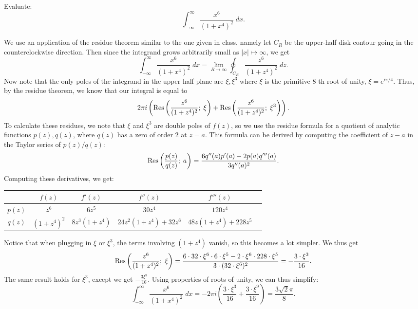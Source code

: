 \documentclass{pset}
\begin{document}
\begin{problem}{11}
  Evaluate:
  \[
    \int^\infty_{-\infty} \frac{x^6}{(1+x^4)^2}\;dx.
  \]
\end{problem}

\begin{solution}
  We use an application of the residue theorem similar to the one given in class, namely let $C_R$ be the upper-half disk contour going in the counterclockwise direction. Then since the integrand grows arbitrarily small as $|x|\mapsto \infty$, we get
  \[\int^\infty_{-\infty} \frac{x^6}{(1+x^4)^2}\;dx = \lim_{R \to \infty}\oint_{C_R} \frac{z^6}{(1+z^4)^2}\;dz.\]
  Now note that the only poles of the integrand in the upper-half plane are $\xi, \xi^3$ where $\xi$ is the primitive $8$-th root of unity, $\xi = e^{i\pi / 4}$. Thus, by the residue theorem, we know that our integral is equal to
  \[{2\pi i}\left(\textrm{Res}\left(\frac{z^6}{(1+z^4)^2};\; \xi\right) + \textrm{Res}\left(\frac{z^6}{(1+z^4)^2};\; \xi^3\right)\right).\]
  To calculate these residues, we note that $\xi$ and $\xi^3$ are double poles of $f(z)$, so we use the residue formula for a quotient of analytic functions $p(z), q(z)$, where $q(z)$ has a zero of order $2$ at $z=a$. This formula can be derived by computing the coefficient of $z-a$ in the Taylor series of $p(z)/q(z)$:
  \[
    \textrm{Res}\left(\frac{p(z)}{q(z)};\; a\right) = \frac{6q''(a)p'(a) - 2p(a)q'''(a)}{3q''(a)^2}.
  \]
  Computing these derivatives, we get:
  \begin{center}\renewcommand{\arraystretch}{1.2}
  \begin{tabular}{ |c|c|c|c|c|c| } 
  \hline
  & $f(z)$ & $f'(z)$ & $f''(z)$ &$f'''(z)$\\
  \hline
    $p(z)$ & $z^6$ & $6z^5$ & $30z^4$ & $120z^4$\\ 
    $q(z)$ & $(1+z^4)^2$ & $8z^3(1+z^4)$ & $24z^2(1+z^4) + 32z^6$ & $48z(1+z^4) + 228z^5$\\ 
  \hline
  \end{tabular}
  \end{center}
  Notice that when plugging in $\xi$ or $\xi^3$, the terms involving $(1+z^4)$ vanish, so this becomes a lot simpler. We thus get
  \[
    \textrm{Res}\left(\frac{z^6}{(1+z^4)^2};\; \xi\right) = \frac{6\cdot 32\cdot \xi^6 \cdot 6\cdot \xi^5 - 2\cdot \xi^6\cdot 228\cdot \xi^5}{3\cdot (32\cdot\xi^6)^2} = -\frac{3\cdot \xi^3}{16}.
  \]
  The same result holds for $\xi^3$, except we get $-\frac{3\xi^9}{16}.$ Using properties of roots of unity, we can thus simplify:
  \[\int^\infty_{-\infty} \frac{x^6}{(1+x^4)^2}\;dx = -2\pi i\left(\frac{3\cdot\xi^3}{16} + \frac{3\cdot\xi^9}{16}\right)= \frac{3\sqrt{2}\pi}{8}.\]
\end{solution}
\end{document}
